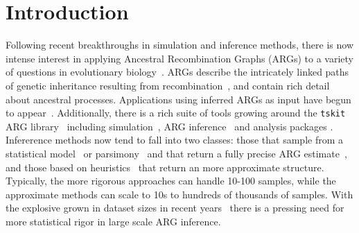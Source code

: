 \documentclass{article}
\begin{document}
\section{Introduction}
Following recent breakthroughs in simulation and inference methods,
there is now intense interest in applying Ancestral Recombination Graphs (ARGs)
to a variety of questions in evolutionary
biology~\citep{lewanski_era_2024,brandt_promise_2024}.
ARGs describe the intricately linked paths
of genetic inheritance resulting from
recombination~\citep{hudson_properties_1983,griffiths_ancestral_1996,wong_general_2023},
and contain rich detail about ancestral processes.
Applications using inferred ARGs as input have begun to
appear~\citep{osmond_estimating_2021,
fan_genealogical_2022,
hejase_deep_2022,
guo_recombination-aware_2022,
zhang_biobank-scale_2023,
nowbandegani_extremely_2023,
ignatieva_distribution_2023,
fan_likelihood_2023,
huang_estimating_2024}.
Additionally, there is a rich suite of tools growing around
the \texttt{tskit} ARG library~\citep{ralph_efficiently_2020}
including simulation~\citep{kelleher_efficient_2016,kelleher_efficient_2018,
adrion_community_2020,terasaki_geonomics_2021,
baumdicker_efficient_2021,
korfmann_weak_2022, petr_slendr_2023,tagami_tstrait_2024},
ARG inference~\citep{kelleher_inferring_2019,speidel_method_2019,
wohns_unified_2022,mahmoudi_bayesian_2022,
rasmussen_espalier_2022,
zhang_biobank-scale_2023,zhan_towards_2023} and analysis
packages
\citep{nowbandegani_extremely_2023,fan_likelihood_2023}.
Infererence methods now tend to fall into two classes: those that
sample from a statistical
model~\citep{rasmussen_genome-wide_2014,hubisz_mapping_2020,mahmoudi_bayesian_2022}
or parsimony~\citep{ignatieva_kwarg_2021} and that return
a fully precise ARG estimate~\citep{wong_general_2023},
and those based on
heuristics~\citep{kelleher_inferring_2019,speidel_method_2019,
zhang_biobank-scale_2023} that return an more approximate structure.
Typically, the more rigorous approaches can handle 10-100 samples,
while the approximate methods can scale to 10s to hundreds of
thousands of samples. With the explosive grown in dataset
sizes in recent years~\citep[e.g.][]{bycroft_genome_2018,halldorsson_sequences_2022,
all_genomic_2024} there is a pressing need for more statistical
rigor in large scale ARG inference.
\end{document}
